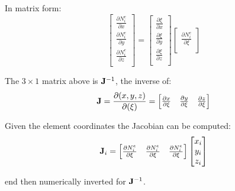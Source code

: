 In matrix form:
\begin{equation}
    \begin{bmatrix}
        \frac{\partial N_i^e}{\partial x} \\
        \frac{\partial N_i^e}{\partial y} \\
        \frac{\partial N_i^e}{\partial z} \\
    \end{bmatrix}
    = \begin{bmatrix}
        \frac{\partial \xi}{\partial x} \\
        \frac{\partial \xi}{\partial y} \\
        \frac{\partial \xi}{\partial z} \\
    \end{bmatrix}
    \begin{bmatrix}
        \frac{\partial N_i^e}{\partial \xi} \\
    \end{bmatrix}
\end{equation}

The $ 3 \times 1 $ matrix above is $ \mathbf{J}^{-1} $, the inverse of:
\begin{equation}
    \mathbf{J} = \frac{\partial (x, y, z)}{\partial(\xi)} =
    \begin{bmatrix}
        \frac{\partial x}{\partial \xi} &
        \frac{\partial y}{\partial \xi} &
        \frac{\partial z}{\partial \xi} \\
    \end{bmatrix}
\end{equation}

Given the element coordinates the Jacobian can be computed:
\begin{equation}
    \mathbf{J}_i = \begin{bmatrix}
        \frac{\partial N_i^e}{\partial \xi} &
        \frac{\partial N_i^e}{\partial \xi} &
        \frac{\partial N_i^e}{\partial \xi} \\
    \end{bmatrix}
    \begin{bmatrix}
        x_i \\
        y_i \\
        z_i \\
    \end{bmatrix}
\end{equation}

end then numerically inverted for $ \mathbf{J}^{-1} $.

